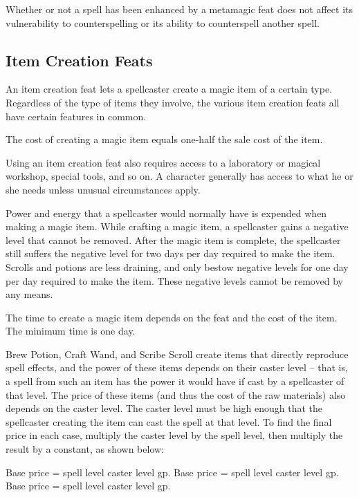  Whether or not a spell has been enhanced by a metamagic feat does not affect its vulnerability to counterspelling or its ability to counterspell another spell.

\subsection{Item Creation Feats}
An item creation feat lets a spellcaster create a magic item of a certain type. Regardless of the type of items they involve, the various item creation feats all have certain features in common.

 The cost of creating a magic item equals one-half the sale cost of the item.

Using an item creation feat also requires access to a laboratory or magical workshop, special tools, and so on. A character generally has access to what he or she needs unless unusual circumstances apply.

 Power and energy that a spellcaster would normally have is expended when making a magic item. While crafting a magic item, a spellcaster gains a negative level that cannot be removed. After the magic item is complete, the spellcaster still suffers the negative level for two days per day required to make the item. Scrolls and potions are less draining, and only bestow negative levels for one day per day required to make the item. These negative levels cannot be removed by any means.

 The time to create a magic item depends on the feat and the cost of the item. The minimum time is one day.

 Brew Potion, Craft Wand, and Scribe Scroll create items that directly reproduce spell effects, and the power of these items depends on their caster level -- that is, a spell from such an item has the power it would have if cast by a spellcaster of that level. The price of these items (and thus the cost of the raw materials) also depends on the caster level. The caster level must be high enough that the spellcaster creating the item can cast the spell at that level. To find the final price in each case, multiply the caster level by the spell level, then multiply the result by a constant, as shown below:

 Base price = spell level \mtimes caster level  gp.
 Base price = spell level \mtimes  caster level  gp.
 Base price = spell level \mtimes  caster level  gp.

